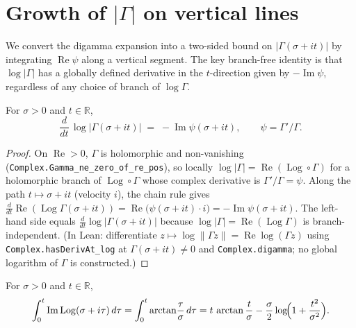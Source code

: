 \section{Growth of \texorpdfstring{$|\Gamma|$}{|Gamma|} on vertical lines}
\label{sec:gs_growth}

We convert the digamma expansion into a two-sided bound on $|\Gamma(\sigma+it)|$ by
integrating $\operatorname{Re}\psi$ along a vertical segment. The key branch-free
identity is that $\log|\Gamma|$ has a globally defined derivative in the
$t$-direction given by $-\operatorname{Im}\psi$, regardless of any choice of branch
of $\log\Gamma$.

\begin{lemma}
\label{lem:gs_deriv_logabs}
\leanok
For $\sigma>0$ and $t\in\mathbb{R}$,
\[
  \frac{d}{dt}\,\log\bigl|\Gamma(\sigma+it)\bigr|
  \;=\; -\operatorname{Im}\psi(\sigma+it),
  \qquad \psi=\Gamma'/\Gamma .
\]
\end{lemma}

\begin{proof}
\leanok
On $\operatorname{Re}>0$, $\Gamma$ is holomorphic and non-vanishing
(\texttt{Complex.Gamma\_ne\_zero\_of\_re\_pos}), so locally $\log|\Gamma|
=\operatorname{Re}(\operatorname{Log}\circ\Gamma)$ for a holomorphic branch of
$\operatorname{Log}\circ\Gamma$ whose complex derivative is $\Gamma'/\Gamma=\psi$.
Along the path $t\mapsto\sigma+it$ (velocity $i$), the chain rule gives
$\frac{d}{dt}\operatorname{Re}(\operatorname{Log}\Gamma(\sigma+it))
=\operatorname{Re}\bigl(\psi(\sigma+it)\cdot i\bigr)=-\operatorname{Im}\psi(\sigma+it)$.
The left-hand side equals $\frac{d}{dt}\log|\Gamma(\sigma+it)|$ because
$\log|\Gamma|=\operatorname{Re}(\operatorname{Log}\Gamma)$ is branch-independent.
(In Lean: differentiate $z\mapsto\log\|\Gamma z\|=\operatorname{Re}\log(\Gamma z)$
using \texttt{Complex.hasDerivAt\_log} at $\Gamma(\sigma+it)\neq0$ and
\texttt{Complex.digamma}; no global logarithm of $\Gamma$ is constructed.)
\end{proof}

\begin{lemma}
\label{lem:gs_arg_integral}
\leanok
For $\sigma>0$ and $t\in\mathbb{R}$,
\[
  \int_{0}^{t}\operatorname{Im}\operatorname{Log}(\sigma+i\tau)\,d\tau
  = \int_0^t \arctan\!\frac{\tau}{\sigma}\,d\tau
  = t\,\arctan\frac{t}{\sigma}-\frac{\sigma}{2}\log\!\Bigl(1+\frac{t^2}{\sigma^2}\Bigr).
\]
\end{lemma}

